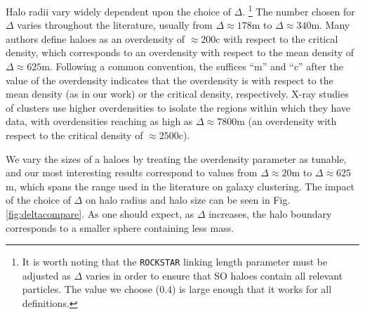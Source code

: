 \documentclass[usenatbib,fleqn]{mnras}
\begin{document}
Halo radii vary widely dependent upon the choice of $\Delta$. \footnote{It is worth noting that the {\tt ROCKSTAR} linking length parameter must be adjusted as $\Delta$ varies in order to ensure that SO haloes contain all relevant particles. The value we choose ($0.4$) is large enough that it works for all definitions.} The number chosen for $\Delta$ varies throughout the literature, usually from $\Delta \approx 178$m to $\Delta \approx 340$m. Many authors define haloes as an overdensity of $\approx 200$c with respect to the critical density, which corresponds to an overdensity with respect to the mean density of $\Delta \approx 625$m. Following a common convention, the suffices ``m'' and ``c'' after the value of the overdensity indicates that the overdensity is with respect to the mean density (as in our work) or the critical density, respectively. X-ray studies of clusters use higher overdensities to isolate the regions within which they have data, with overdensities reaching as high as $\Delta \approx 7800$m (an overdensity with respect to the critical density of $\approx 2500$c). 

We vary the sizes of a haloes by treating the overdensity parameter as tunable, and our most interesting results correspond to values from $\Delta \approx 20$m to $\Delta \approx 625$m, which spans the range used in the literature on galaxy clustering. 
The impact of the choice of $\Delta$ on halo radius and halo size can be seen in Fig.~ \ref{fig:deltacompare}. As one should expect, as $\Delta$ increases, the halo boundary corresponds to a smaller sphere containing less mass. 
\end{document}
